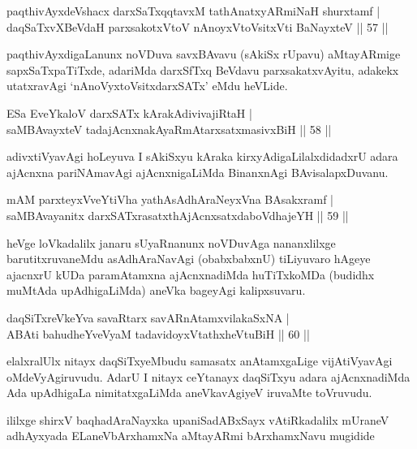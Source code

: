 \begin{shl}
paqthivAyxdeVshacx darxSaTxqqtavxM tathA\s natxyARmiNaH shurxtamf |\\
daqSaTxvXBeVdaH parxsakotxV\s toV nAnoyxV\s toV\s sitxVti BaNayxteV \hfill || 57 ||
\end{shl}

\begin{artha}
paqthivAyxdigaLanunx noVDuva savxBAvavu (sAkiSx rUpavu) aMtayARmige sapxSaTxpaTiTxde, adariMda darxSfTxq BeVdavu parxsakatxvAyitu, adakekx utatxravAgi `nAnoVyxtoV\s sitxdarxSATx' eMdu heVLide.
\end{artha}


\begin{shl}
ESa EveYkaloV darxSATx kArakAdivivajiRtaH |\\
saMBAvayxteV tadajAcnxnakAyaRmAtarxsatxmasivxBiH \hfill || 58 ||
\end{shl}

\begin{artha}
adivxtiVyavAgi hoLeyuva I sAkiSxyu kAraka kirxyAdigaLilalxdidadxrU adara ajAcnxna pariNAmavAgi ajAcnxnigaLiMda BinanxnAgi BAvisalapxDuvanu.
\end{artha}

\begin{shl}
mAM parxteyxVveYtiVha yathA\s sAdhAraNeyxVna BAsakxramf |\\
saMBAvayanitx darxSATxrasatxthA\s jAcnxsatxdaboVdhajeYH \hfill || 59 ||
\end{shl}

\begin{artha}
heVge loVkadalilx janaru sUyaRnanunx noVDuvAga nananxlilxge barutitxruvaneMdu asAdhAraNavAgi (obabxbabxnU) tiLiyuvaro hAgeye ajacnxrU kUDa paramAtamxna ajAcnxnadiMda huTiTxkoMDa (budidhx muMtAda upAdhigaLiMda) aneVka bageyAgi kalipxsuvaru.
\end{artha}%


\begin{shl}
daqSiTxreVkeYva savaRtarx savARnAtamxvilakaSxNA |\\
ABAti bahudheYveVyaM tadavidoyxVtathxheVtuBiH \hfill || 60 ||
\end{shl}

\begin{artha}
elalxralUlx nitayx daqSiTxyeMbudu samasatx anAtamxgaLige vijAtiVyavAgi oMdeVyAgiruvudu. AdarU I nitayx ceYtanayx daqSiTxyu adara ajAcnxnadiMda Ada upAdhigaLa nimitatxgaLiMda aneVkavAgiyeV iruvaMte toVruvudu.
\end{artha}

\begin{center}
ililxge shirxV baqhadAraNayxka upaniSadABxSayx vAtiRkadalilx mUraneV adhAyxyada ELaneVbArxhamxNa aMtayARmi bArxhamxNavu mugidide
\end{center}

